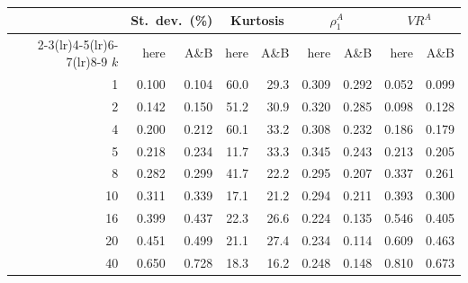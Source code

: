 \begin{tabular}{rrrrrrrrr}
\toprule
 & \multicolumn{2}{c}{St.\ dev.\ (\%)} & \multicolumn{2}{c}{Kurtosis} & \multicolumn{2}{c}{$\rho_1^A$} & \multicolumn{2}{c}{$VR^A$} \\
\cmidrule(lr){2-3}\cmidrule(lr){4-5}\cmidrule(lr){6-7}\cmidrule(lr){8-9}
$k$ & here & A\&B & here & A\&B & here & A\&B & here & A\&B \\
\midrule
1 & 0.100 & 0.104 & 60.0 & 29.3 & 0.309 & 0.292 & 0.052 & 0.099 \\
2 & 0.142 & 0.150 & 51.2 & 30.9 & 0.320 & 0.285 & 0.098 & 0.128 \\
4 & 0.200 & 0.212 & 60.1 & 33.2 & 0.308 & 0.232 & 0.186 & 0.179 \\
5 & 0.218 & 0.234 & 11.7 & 33.3 & 0.345 & 0.243 & 0.213 & 0.205 \\
8 & 0.282 & 0.299 & 41.7 & 22.2 & 0.295 & 0.207 & 0.337 & 0.261 \\
10 & 0.311 & 0.339 & 17.1 & 21.2 & 0.294 & 0.211 & 0.393 & 0.300 \\
16 & 0.399 & 0.437 & 22.3 & 26.6 & 0.224 & 0.135 & 0.546 & 0.405 \\
20 & 0.451 & 0.499 & 21.1 & 27.4 & 0.234 & 0.114 & 0.609 & 0.463 \\
40 & 0.650 & 0.728 & 18.3 & 16.2 & 0.248 & 0.148 & 0.810 & 0.673 \\
\bottomrule
\end{tabular}